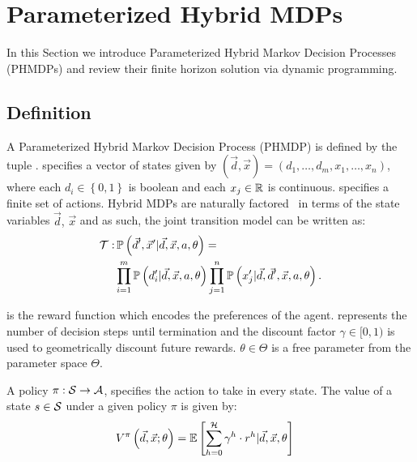 \section{Parameterized Hybrid MDPs}
\label{sec:hybrid_mdps}

In this Section we introduce Parameterized Hybrid Markov Decision Processes (PHMDPs) and review their finite horizon solution via dynamic programming.

\subsection{Definition}
\label{sec:hybrid_mdps_def}

A Parameterized Hybrid Markov Decision Process (PHMDP) is defined by the tuple {\footnotesize \PMDPTuple}. {\footnotesize \State} specifies a vector of states given by {\footnotesize $( \vec{d}, \vec{x}) = \left( d_1, \ldots, d_m, x_1, \ldots, x_n \right) $}, where each {\footnotesize $ d_i \in \left\lbrace 0, 1 \right\rbrace $} 
is boolean and each {\footnotesize$ x_j \in \mathbb{R} $} is continuous. {\footnotesize \Action} specifies a finite set of actions. Hybrid MDPs
are naturally factored~\parencite{Boutilier_JAIR_1999} in terms of the state variables {\footnotesize$\vec{d}$, $\vec{x}$} and as such, the joint transition model can be written as:
{\footnotesize
\abovedisplayskip=0pt
\belowdisplayskip=0pt
\begin{align}
    \label{eq:hmdp_tfunc}
    \mathcal{T} :& \, \mathbb{P}\left({\vec{d}', \vec{x}' | \vec{d}, \vec{x}, a, \theta}\right) = \nonumber \\
    & \prod_{i=1}^{m} \mathbb{P}\left({d_i' | \vec{d}, \vec{x}, a, \theta}\right) \prod_{j=1}^{n} \mathbb{P}\left({x_j' | \vec{d}, \vec{d}', \vec{x}, a, \theta}\right).
\end{align}   
}

{\footnotesize \RewardFunc} is the reward function which encodes the preferences of the agent. {\footnotesize \Horizon} represents the number of decision steps until termination and the discount factor {\footnotesize $\gamma \in [0, 1)$} is used to geometrically discount future rewards. {\footnotesize $\theta \in \Theta$} is a free parameter from the parameter space {\footnotesize $ \Theta $}.

A policy {\footnotesize $\pi : \mathcal{S} \rightarrow \mathcal{A}$}, specifies the action to take in every state. The value of a state {\footnotesize $s \in \mathcal{S}$} under a given policy {\footnotesize$\pi$} is given by:
{\footnotesize 
    \abovedisplayskip=0pt
    \belowdisplayskip=0pt
\begin{align*}
    V^{\pi}\left( \vec{d}, \vec{x}; \theta \right) &= {\mathbb{E}\left[{\sum\limits_{h = 0}^{\mathcal{H}} \gamma^h \cdot r^h | \vec{d}, \vec{x}, \theta}\right]} \nonumber  
\end{align*}
}

